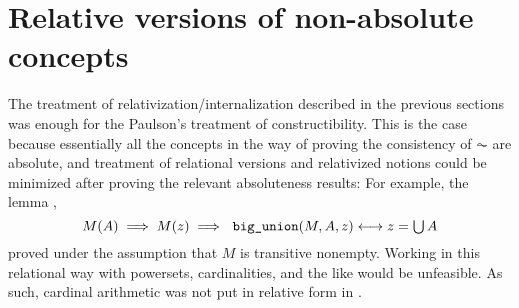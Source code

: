 \section{Relative versions of non-absolute concepts}
\label{sec:relat-vers-non-absol}

The treatment of relativization/internalization described in the
previous sections was enough for the Paulson's treatment of
constructibility. This is the case because essentially all the
concepts in the way of proving the consistency of $\AC$ are
absolute, and treatment of relational versions and relativized notions
could be minimized after proving the relevant absoluteness results:
For example, the lemma ,
\[
  M(A) \implies M(z) \implies \isatt{big{\uscore}union}(M, A, z) \longleftrightarrow z = \union
  A
\]
proved under the assumption that $M$ is transitive nonempty. Working
in this relational 
way with powersets, cardinalities, and the like would be
unfeasible. As such, cardinal arithmetic was not put in relative form
in .


